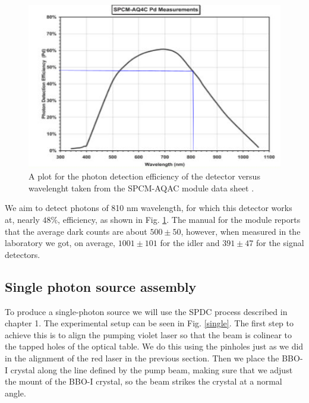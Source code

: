 \documentclass[12pt]{book}
\begin{document}
\begin{figure}[t!]
\centering
\includegraphics[scale=1]{images/effiency.png}
\caption{A plot for the photon detection efficiency of the detector versus wavelenght taken from the SPCM-AQAC module data sheet \cite{manual}.}
\label{module}
\end{figure}

We aim to detect photons of 810 nm wavelength, for which this detector works at, nearly $48\%$, efficiency, as shown in Fig. \ref{module}. The manual for the module \cite{manual} reports that the average dark counts are about $500\pm 50$, however, when measured in the laboratory we got, on average, $ 1001 \pm 101$ for the idler and $391 \pm 47$ for the signal detectors.

\subsection{Single photon source assembly}

To produce a single-photon source we will use the SPDC process described in chapter 1. The experimental setup can be seen in Fig. \ref{single}. The first step to achieve this is to align the pumping violet laser so that the beam is colinear to the tapped holes of the optical table. We do this using the pinholes just as we did in the alignment of the red laser in the previous section. Then we place the BBO-I crystal along the line defined by the pump beam, making sure that we adjust the mount of the BBO-I crystal, so the beam strikes the crystal at a normal angle.
\end{document}
